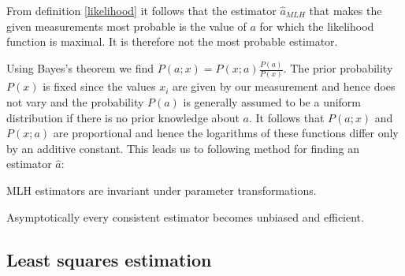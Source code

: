 {    From definition \ref{likelihood} it follows that the estimator $\hat{a}_{MLH}$ that makes the given measurements most probable is the value of $a$ for which the likelihood function is maximal. It is therefore not the most probable estimator.

    Using Bayes's theorem we find $P(a;x) = P(x;a)\frac{P(a)}{P(x)}$. The prior probability $P(x)$ is fixed since the values $x_i$ are given by our measurement and hence does not vary and the probability $P(a)$ is generally assumed to be a uniform distribution if there is no prior knowledge about $a$. It follows that $P(a;x)$ and $P(x;a)$ are proportional and hence the logarithms of these functions differ only by an additive constant. This leads us to following method for finding an estimator $\hat{a}$:

    \begin{property}
        MLH estimators are invariant under parameter transformations.
    \end{property}

    \begin{property}
        Asymptotically every consistent estimator becomes unbiased and efficient.
    \end{property}

\subsection{Least squares estimation}

}
